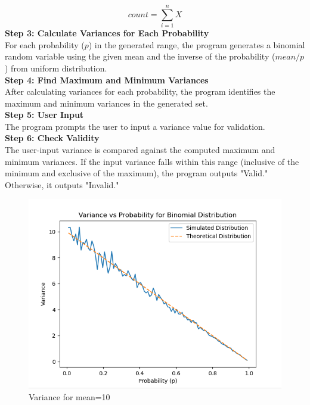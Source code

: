 \documentclass[journal,12pt,twocolumn]{IEEEtran}
\begin{document}
\[
count= \sum_{i=1}^{n} X
\]
\textbf{Step 3: Calculate Variances for Each Probability}\\
For each probability (\(p\)) in the generated range, the program generates a binomial random variable using the given mean and the inverse of the probability (\(mean/p\)) from uniform distribution.\\
\textbf{Step 4: Find Maximum and Minimum Variances}\\
After calculating variances for each probability, the program identifies the maximum and minimum variances in the generated set.\\
\textbf{Step 5: User Input}\\
The program prompts the user to input a variance value for validation.
\\
\textbf{Step 6: Check Validity}\\
The user-input variance is compared against the computed maximum and minimum variances. If the input variance falls within this range (inclusive of the minimum and exclusive of the maximum), the program outputs "Valid." Otherwise, it outputs "Invalid."
\begin{figure}[ht!]
    \centering
    \includegraphics[width=\columnwidth]{2023/BM/12/codes/ss10.png}
    \caption{Variance for mean=10}
    \label{fig:ss10}
\end{figure}

	

	
\end{document}
